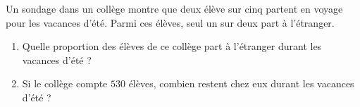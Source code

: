 
\begin{exercice}\label{exo2smath-0095}

    Un sondage dans un collège montre que deux élève sur cinq partent en voyage pour les vacances d'été. Parmi ces élèves, seul un sur deux part à l'étranger.
    \begin{enumerate}
        \item
    Quelle proportion des élèves de ce collège part à l'étranger durant les vacances d'été ?
\item
    Si le collège compte \( 530\) élèves, combien restent chez eux durant les vacances d'été ?
    \end{enumerate}

\end{exercice}
